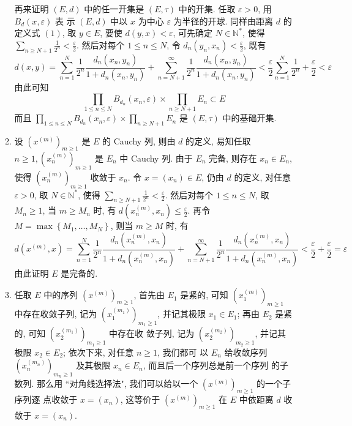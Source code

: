 \begin{enumerate}
\begin{answer}
\begin{enumerate}
                再来证明 $(E, d)$ 中的任一开集是 $(E, \tau)$ 中的开集. 任取 $\varepsilon>0$, 用 $B_{d}(x, \varepsilon)$ 表 示 $(E, d)$ 中以 $x$ 为中心 $\varepsilon$ 为半径的开球. 同样由距离 $d$ 的定义式 $(1)$, 取 $y \in E$, 要使 $d(y, x)<\varepsilon$, 可先确定 $N \in \mathbb{N}^{*}$, 使得 $\sum_{n \geq N+1} \frac{1}{2^{n}}<\frac{\varepsilon}{2}$. 然后对每个 $1 \leq n \leq N$, 令 $d_{n}\left(y_{n}, x_{n}\right)<\frac{\varepsilon}{2}$, 既有
                \[
                d(x, y)=\sum_{n=1}^{N} \frac{1}{2^{n}} \frac{d_{n}\left(x_{n}, y_{n}\right)}{1+d_{n}\left(x_{n}, y_{n}\right)}+\sum_{n=N+1}^{\infty} \frac{1}{2^{n}} \frac{d_{n}\left(x_{n}, y_{n}\right)}{1+d_{n}\left(x_{n}, y_{n}\right)}<\frac{\varepsilon}{2} \sum_{n=1}^{N} \frac{1}{2^{n}}+\frac{\varepsilon}{2}<\varepsilon
                \]由此可知
                \[
                \prod_{1 \leq n \leq N} B_{d_{n}}\left(x_{n}, \varepsilon\right) \times \prod_{n \geq N+1} E_{n} \subset E
                \]
                而且 $\prod_{1 \leq n \leq N} B_{d_{n}}\left(x_{n}, \varepsilon\right) \times \prod_{n \geq N+1} E_{n}$ 是 $(E, \tau)$ 中的基础开集.
                \item 设 $\left(x^{(m)}\right)_{m \geq 1}$ 是 $E$ 的 Cauchy 列, 则由 $d$ 的定义, 易知任取 $n \geq 1,\left(x_{n}^{(m)}\right)_{m \geq 1}$ 是 $E_{n}$ 中 Cauchy 列. 由于 $E_{n}$ 完备, 则存在 $x_{n} \in E_{n}$, 使得 $\left(x_{n}^{(m)}\right)_{m \geq 1}$ 收敛于 $x_{n}$. 令 $x=\left(x_{n}\right) \in E$, 仍由 $d$ 的定义, 对任意 $\varepsilon>0$, 取 $N \in \mathbb{N}^{*}$, 使得 $\sum_{n \geq N+1} \frac{1}{2^{n}}<\frac{\varepsilon}{2}$. 然后对每个 $1 \leq n \leq N$, 取 $M_{n} \geq 1$, 当 $m \geq M_{n}$ 时, 有 $d\left(x_{n}^{(m)}, x_{n}\right) \leq \frac{\varepsilon}{2}$. 再令 $M=\max \left\{M_{1}, \ldots, M_{N}\right\}$, 则当 $m \geq M$ 时, 有
                \[
                d\left(x^{(m)}, x\right)=\sum_{n=1}^{N} \frac{1}{2^{n}} \frac{d_{n}\left(x_{n}^{(m)}, x_{n}\right)}{1+d_{n}\left(x_{n}^{(m)}, x_{n}\right)}+\sum_{n=N+1}^{\infty} \frac{1}{2^{n}} \frac{d_{n}\left(x_{n}^{(m)}, x_{n}\right)}{1+d_{n}\left(x_{n}^{(m)}, x_{n}\right)}<\frac{\varepsilon}{2}+\frac{\varepsilon}{2}=\varepsilon
                \]
                由此证明 $E$ 是完备的.
                \item 任取 $E$ 中的序列 $\left(x^{(m)}\right)_{m \geq 1}$, 首先由 $E_{1}$ 是紧的, 可知 $\left(x_{1}^{(m)}\right)_{m \geq 1}$ 中存在收敛子列, 记为 $\left(x_{1}^{\left(m_{1}\right)}\right)_{m_{1} \geq 1}$, 并记其极限 $x_{1} \in E_{1}$; 再由 $E_{2}$ 是紧的, 可知 $\left(x_{2}^{\left(m_{1}\right)}\right)_{m_{1} \geq 1}$ 中存在收 敛子列, 记为 $\left(x_{2}^{\left(m_{2}\right)}\right)_{m_{2} \geq 1}$, 并记其极限 $x_{2} \in E_{2}$; 依次下来, 对任意 $n \geq 1$, 我们都可 以 $E_{n}$ 给收敛序列 $\left(x_{n}^{\left(m_{n}\right)}\right)_{m_{n} \geq 1}$ 及其极限 $x_{n} \in E_{n}$, 而且后一个序列总是前一个序列 的子数列. 那么用 “对角线选择法", 我们可以给以一个 $\left(x^{(m)}\right)_{m \geq 1}$ 的一个子序列逐 点收敛于 $x=\left(x_{n}\right)$, 这等价于 $\left(x^{(m)}\right)_{m \geq 1}$ 在 $E$ 中依距离 $d$ 收敛于 $x=\left(x_{n}\right)$.

\end{enumerate}
\end{answer}
\end{enumerate}
